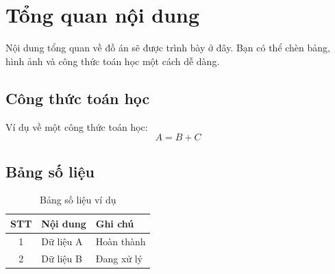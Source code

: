 \section{Tổng quan nội dung}
\label{sec:summary}

Nội dung tổng quan về đồ án sẽ được trình bày ở đây. Bạn có thể chèn bảng, hình ảnh và công thức toán học một cách dễ dàng.

\subsection{Công thức toán học}
Ví dụ về một công thức toán học:
\begin{equation}
    A = B + C
\end{equation}

\subsection{Bảng số liệu}
\begin{table}[H]
    \centering
    \caption{Bảng số liệu ví dụ}
    \vspace{0.2cm}
    \begin{tabular}{|c|l|l|}
        \hline
        \textbf{STT} & \textbf{Nội dung} & \textbf{Ghi chú} \\
        \hline
        1 & Dữ liệu A & Hoàn thành \\
        2 & Dữ liệu B & Đang xử lý \\
        \hline
    \end{tabular}
    \label{tab:sample}
\end{table}
